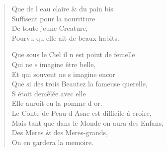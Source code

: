 \begin{verse}
\vin Que de l\textquotesingle{} eau claire \& du pain bis \\
\vin Suffisent pour la nourriture \\
\vin De toute jeune Creature, \\
\vin Pourvu qu\textquotesingle{} elle ait de beaux habits.

\vin Que sous le Ciel il n\textquotesingle{} est point de femelle \\
\vin Qui ne s\textquotesingle{} imagine être belle, \\
\vin Et qui souvent ne s\textquotesingle{} imagine encor \\
Que si des trois Beautez la fameuse querelle, \\
\vin S\textquotesingle{} étoit demêlée avec elle \\
\vin Elle auroit eu la pomme d\textquotesingle{} or. \\
Le Conte de Peau d\textquotesingle{} Asne est difficile à croire, \\
Mais tant que dans le Monde on aura des Enfans, \\
\vin Des Meres \& des Meres-grands, \\
\vin On en gardera la memoire.
\end{verse}

